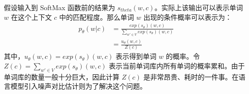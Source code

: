 假设输入到 SoftMax 函数前的结果为 $s_{theta}(w,c)$。实际上该输出可以表示单词 $w$ 在这个上下文 $c$ 中的匹配程度。那么单词 $w$ 出现的条件概率可以表示为：
\begin{equation}
    \begin{aligned}
        p_{\theta}(w|c) & = \frac{exp(s_{\theta})(w,c)}{\sum_{w' \in V} exp(s_{\theta})(w,c)} \\
        & = \frac{u_{\theta}(w,c)}{Z(c)} \label{for:nce2}
    \end{aligned}
\end{equation}
其中，$u_{\theta}(w,c) = exp(s_{\theta})(w,c)$ 表示得到单词 $w$ 的概率。令 $Z(c) = \sum_{w' \in V} exp(s_{\theta})(w,c)$ 表示当前单词库内所有单词的概率累和。由于单词库的数量一般十分巨大，因此计算 $Z(c)$ 是非常昂贵、耗时的一件事。在语言模型引入噪声对比估计则为了解决这个问题。

